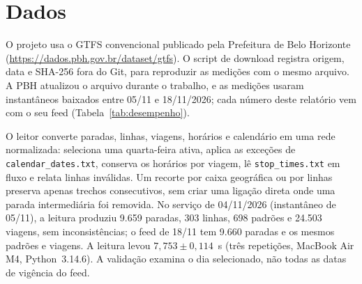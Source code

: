 \section{Dados}\label{sec:dados}

O projeto usa o GTFS convencional publicado pela Prefeitura de Belo Horizonte
(\url{https://dados.pbh.gov.br/dataset/gtfs}). O script de download registra origem, data e
SHA-256 fora do Git, para reproduzir as medições com o mesmo arquivo. A PBH atualizou o arquivo
durante o trabalho, e as medições usaram instantâneos baixados entre 05/11 e 18/11/2026; cada número
deste relatório vem com o seu feed (Tabela~\ref{tab:desempenho}).

O leitor converte paradas, linhas, viagens, horários e calendário em uma rede normalizada:
seleciona uma quarta-feira ativa, aplica as exceções de \texttt{calendar\_dates.txt}, conserva
os horários por viagem, lê \texttt{stop\_times.txt} em fluxo e relata linhas inválidas. Um
recorte por caixa geográfica ou por linhas preserva apenas trechos consecutivos, sem criar uma
ligação direta onde uma parada intermediária foi removida. No serviço de 04/11/2026 (instantâneo
de 05/11), a leitura produziu 9.659 paradas, 303 linhas, 698 padrões e 24.503 viagens, sem
inconsistências; o feed de 18/11 tem 9.660 paradas e os mesmos padrões e viagens. A leitura levou
$7{,}753 \pm 0{,}114$~s (três repetições, MacBook Air M4, Python~3.14.6). A validação examina o
dia selecionado, não todas as datas de vigência do feed.
